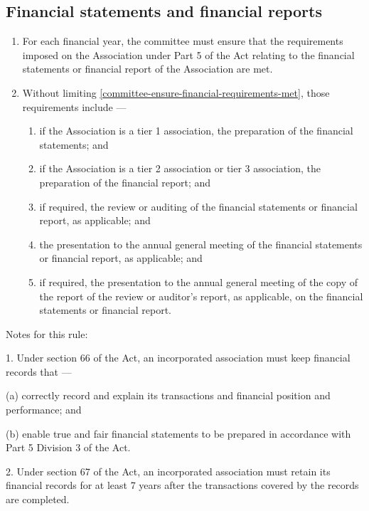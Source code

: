 \documentclass[../constitution.tex]{subfiles}
\begin{document}
\hypertarget{financial-statements-and-financial-reports}{%
\subsection{Financial statements and financial reports}\label{financial-statements-and-financial-reports}}

\begin{enumerate}

\item For each financial year, the committee must ensure that the requirements imposed on the Association under Part 5 of the Act relating to the financial statements or financial report of the Association are met. \label{committee-ensure-financial-requirements-met}
\item Without limiting  \ref{committee-ensure-financial-requirements-met}, those requirements include ---

  \begin{enumerate}
  
  \item if the Association is a tier 1 association, the preparation of the financial statements; and
  \item if the Association is a tier 2 association or tier 3 association, the preparation of the financial report; and
  \item if required, the review or auditing of the financial statements or financial report, as applicable; and
  \item the presentation to the annual general meeting of the financial statements or financial report, as applicable; and
  \item if required, the presentation to the annual general meeting of the copy of the report of the review or auditor's report, as applicable, on the financial statements or financial report.
  \end{enumerate}
\end{enumerate}


Notes for this rule: 

1. Under section 66 of the Act, an incorporated association must keep 
financial records that —  

(a) correctly record and explain its transactions and financial position and performance; and 

(b) enable true and fair financial statements to be prepared in accordance with Part 5 Division 3 of the Act. 

2. Under section 67 of the Act, an incorporated association must retain its financial records for at least 7 years after the transactions covered by the records are completed. 
\end{document}
